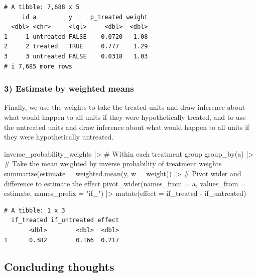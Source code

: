 \documentclass[
  letterpaper,
  DIV=11,
  numbers=noendperiod]{scrartcl}
\newenvironment{Shaded}{\begin{snugshade}}{\end{snugshade}}
\newcommand{\AttributeTok}[1]{\textcolor[rgb]{0.40,0.45,0.13}{#1}}
\newcommand{\CommentTok}[1]{\textcolor[rgb]{0.37,0.37,0.37}{#1}}
\newcommand{\FunctionTok}[1]{\textcolor[rgb]{0.28,0.35,0.67}{#1}}
\newcommand{\NormalTok}[1]{\textcolor[rgb]{0.00,0.23,0.31}{#1}}
\newcommand{\SpecialCharTok}[1]{\textcolor[rgb]{0.37,0.37,0.37}{#1}}
\newcommand{\StringTok}[1]{\textcolor[rgb]{0.13,0.47,0.30}{#1}}
\begin{document}
\begin{verbatim}
# A tibble: 7,688 x 5
     id a         y     p_treated weight
  <dbl> <chr>     <lgl>     <dbl>  <dbl>
1     1 untreated FALSE    0.0720   1.08
2     2 treated   TRUE     0.777    1.29
3     3 untreated FALSE    0.0318   1.03
# i 7,685 more rows
\end{verbatim}

\subsubsection{3) Estimate by weighted
means}\label{estimate-by-weighted-means}

Finally, we use the weights to take the treated units and draw inference
about what would happen to all units if they were hypothetically
treated, and to use the untreated units and draw inference about what
would happen to all units if they were hypothetically untreated.

\begin{Shaded}
\begin{Highlighting}[]
\NormalTok{inverse\_probability\_weights }\SpecialCharTok{|\textgreater{}}
  \CommentTok{\# Within each treatment group}
  \FunctionTok{group\_by}\NormalTok{(a) }\SpecialCharTok{|\textgreater{}}
  \CommentTok{\# Take the mean weighted by inverse probability of treatment weights}
  \FunctionTok{summarize}\NormalTok{(}\AttributeTok{estimate =} \FunctionTok{weighted.mean}\NormalTok{(y, }\AttributeTok{w =}\NormalTok{ weight)) }\SpecialCharTok{|\textgreater{}}
  \CommentTok{\# Pivot wider and difference to estimate the effect}
  \FunctionTok{pivot\_wider}\NormalTok{(}\AttributeTok{names\_from =}\NormalTok{ a, }\AttributeTok{values\_from =}\NormalTok{ estimate, }\AttributeTok{names\_prefix =} \StringTok{"if\_"}\NormalTok{) }\SpecialCharTok{|\textgreater{}}
  \FunctionTok{mutate}\NormalTok{(}\AttributeTok{effect =}\NormalTok{ if\_treated }\SpecialCharTok{{-}}\NormalTok{ if\_untreated)}
\end{Highlighting}
\end{Shaded}

\begin{verbatim}
# A tibble: 1 x 3
  if_treated if_untreated effect
       <dbl>        <dbl>  <dbl>
1      0.382        0.166  0.217
\end{verbatim}

\subsection{Concluding thoughts}\label{concluding-thoughts}
\end{document}

